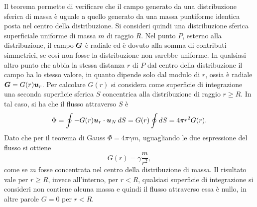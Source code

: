 Il teorema permette di verificare che il campo generato da una distribuzione sferica di massa è uguale a quello generato da una massa puntiforme identica posta nel centro della distribuzione. Si consideri quindi una distribuzione sferica superficiale uniforme di massa $m$ di raggio $R$. Nel punto $P$, esterno alla distribuzione, il campo $\bm{G}$ è radiale ed è dovuto alla somma di contributi simmetrici, se così non fosse la distribuzione non sarebbe uniforme. In qualsiasi altro punto che abbia la stessa distanza $r$ di $P$ dal centro della distribuzione il campo ha lo stesso valore, in quanto dipende solo dal modulo di $r$, ossia è radiale $\bm{G}=G(r)\bm{u}_r$. Per calcolare $G(r)$ si considera come superficie di integrazione una seconda superficie sferica $S$ concentrica alla distribuzione di raggio $r\ge R$. In tal caso, si ha che il flusso attraverso $S$ è
\begin{equation}
    \Phi=\oint-G(r)\bm{u}_r\cdot\bm{u}_N\,dS=G(r)\oint dS=4\pi r^2G(r).
\end{equation}
Dato che per il teorema di Gauss $\Phi=4\pi\gamma m$, uguagliando le due espressione del flusso si ottiene
\begin{equation}
    G(r)=\gamma\frac{m}{r^2},
\end{equation}
come se $m$ fosse concentrata nel centro della distribuzione di massa. Il risultato vale per $r\ge R$, invece all'interno, per $r<R$, qualsiasi superficie di integrazione si consideri non contiene alcuna massa e quindi il flusso attraverso essa è nullo, in altre parole $G=0$ per $r<R$.

